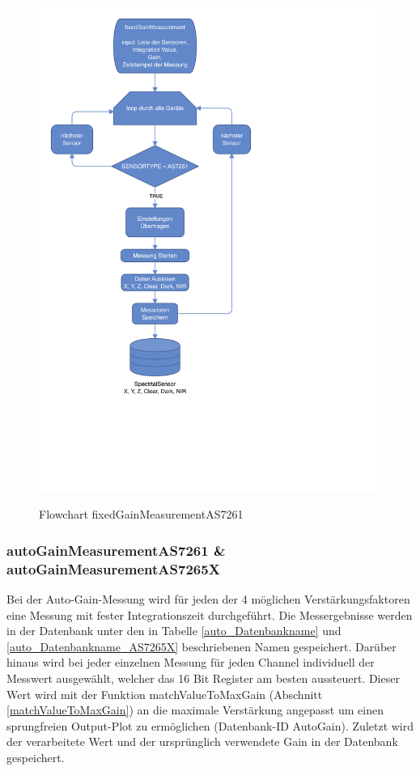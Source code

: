 \begin{figure}[H]
  \centering
    \caption{Flowchart fixedGainMeasurementAS7261}
 \includegraphics[width=0.8\linewidth]{img/manualGain}
  \label{fig:manualGain}
\end{figure}


\subsubsection{autoGainMeasurementAS7261 \& autoGainMeasurementAS7265X}
Bei der Auto-Gain-Messung wird für jeden der 4 möglichen Verstärkungsfaktoren eine Messung mit fester Integrationszeit durchgeführt.
Die Messergebnisse werden in der Datenbank unter den in Tabelle \ref{auto_Datenbankname} und \ref{auto_Datenbankname_AS7265X} beschriebenen Namen gespeichert.
Darüber hinaus wird bei jeder einzelnen Messung für jeden Channel individuell der Messwert ausgewählt, welcher das 16 Bit Register am besten aussteuert.
Dieser Wert wird mit der Funktion matchValueToMaxGain (Abschnitt \ref{matchValueToMaxGain}) an die maximale Verstärkung angepasst um einen sprungfreien Output-Plot zu ermöglichen (Datenbank-ID AutoGain).
Zuletzt wird der verarbeitete Wert und der ursprünglich verwendete Gain in der Datenbank gespeichert.



